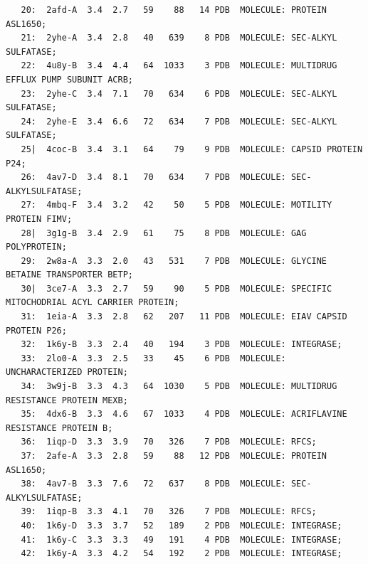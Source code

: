 \documentclass{bmcart}
\begin{document}
\begin{verbatim}
   20:  2afd-A  3.4  2.7   59    88   14 PDB  MOLECULE: PROTEIN ASL1650;                                           
   21:  2yhe-A  3.4  2.8   40   639    8 PDB  MOLECULE: SEC-ALKYL SULFATASE;                                       
   22:  4u8y-B  3.4  4.4   64  1033    3 PDB  MOLECULE: MULTIDRUG EFFLUX PUMP SUBUNIT ACRB;                        
   23:  2yhe-C  3.4  7.1   70   634    6 PDB  MOLECULE: SEC-ALKYL SULFATASE;                                       
   24:  2yhe-E  3.4  6.6   72   634    7 PDB  MOLECULE: SEC-ALKYL SULFATASE;                                       
   25|  4coc-B  3.4  3.1   64    79    9 PDB  MOLECULE: CAPSID PROTEIN P24;                                        
   26:  4av7-D  3.4  8.1   70   634    7 PDB  MOLECULE: SEC-ALKYLSULFATASE;                                        
   27:  4mbq-F  3.4  3.2   42    50    5 PDB  MOLECULE: MOTILITY PROTEIN FIMV;                                     
   28|  3g1g-B  3.4  2.9   61    75    8 PDB  MOLECULE: GAG POLYPROTEIN;                                           
   29:  2w8a-A  3.3  2.0   43   531    7 PDB  MOLECULE: GLYCINE BETAINE TRANSPORTER BETP;                          
   30|  3ce7-A  3.3  2.7   59    90    5 PDB  MOLECULE: SPECIFIC MITOCHODRIAL ACYL CARRIER PROTEIN;                
   31:  1eia-A  3.3  2.8   62   207   11 PDB  MOLECULE: EIAV CAPSID PROTEIN P26;                                   
   32:  1k6y-B  3.3  2.4   40   194    3 PDB  MOLECULE: INTEGRASE;                                                 
   33:  2lo0-A  3.3  2.5   33    45    6 PDB  MOLECULE: UNCHARACTERIZED PROTEIN;                                   
   34:  3w9j-B  3.3  4.3   64  1030    5 PDB  MOLECULE: MULTIDRUG RESISTANCE PROTEIN MEXB;                         
   35:  4dx6-B  3.3  4.6   67  1033    4 PDB  MOLECULE: ACRIFLAVINE RESISTANCE PROTEIN B;                          
   36:  1iqp-D  3.3  3.9   70   326    7 PDB  MOLECULE: RFCS;                                                      
   37:  2afe-A  3.3  2.8   59    88   12 PDB  MOLECULE: PROTEIN ASL1650;                                           
   38:  4av7-B  3.3  7.6   72   637    8 PDB  MOLECULE: SEC-ALKYLSULFATASE;                                        
   39:  1iqp-B  3.3  4.1   70   326    7 PDB  MOLECULE: RFCS;                                                      
   40:  1k6y-D  3.3  3.7   52   189    2 PDB  MOLECULE: INTEGRASE;                                                 
   41:  1k6y-C  3.3  3.3   49   191    4 PDB  MOLECULE: INTEGRASE;                                                 
   42:  1k6y-A  3.3  4.2   54   192    2 PDB  MOLECULE: INTEGRASE;                                                 

\end{verbatim}
\end{document}
